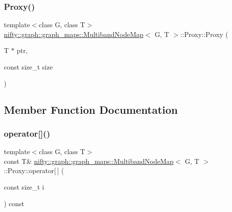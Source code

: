 \subsubsection{\texorpdfstring{Proxy()}{Proxy()}}
{\footnotesize\ttfamily template$<$class G, class T$>$ \\
\hyperlink{structnifty_1_1graph_1_1graph__maps_1_1MultibandNodeMap}{nifty\+::graph\+::graph\+\_\+maps\+::\+Multiband\+Node\+Map}$<$ G, T $>$\+::Proxy\+::\+Proxy (\begin{DoxyParamCaption}\item[{T $\ast$}]{ptr,  }\item[{const size\+\_\+t}]{size }\end{DoxyParamCaption})\hspace{0.3cm}{\ttfamily [inline]}}



\subsection{Member Function Documentation}
\mbox{\label{classnifty_1_1graph_1_1graph__maps_1_1MultibandNodeMap_1_1Proxy_a492fd36162499ac45136fbde2aad34e0}} 
\subsubsection{\texorpdfstring{operator[]()}{operator[]()}\hspace{0.1cm}{\footnotesize\ttfamily [1/2]}}
{\footnotesize\ttfamily template$<$class G, class T$>$ \\
const T\& \hyperlink{structnifty_1_1graph_1_1graph__maps_1_1MultibandNodeMap}{nifty\+::graph\+::graph\+\_\+maps\+::\+Multiband\+Node\+Map}$<$ G, T $>$\+::Proxy\+::operator\mbox{[}$\,$\mbox{]} (\begin{DoxyParamCaption}\item[{const size\+\_\+t}]{i }\end{DoxyParamCaption}) const\hspace{0.3cm}{\ttfamily [inline]}}

